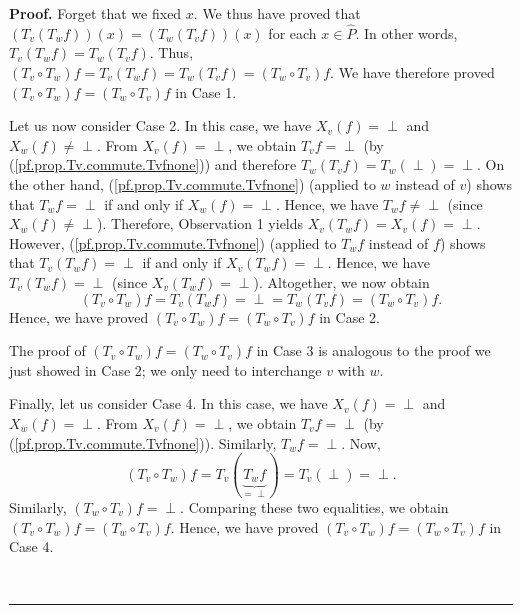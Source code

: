 \documentclass[numbers=enddot,12pt,final,onecolumn,notitlepage]{scrartcl}%
\theoremstyle{definition}
\newenvironment{verlong}{}{}
\newcommand{\undf}{\operatorname*{\bot}}
\newenvironment{proof}[1][Proof]{\noindent\textbf{#1.} }{\ \rule{0.5em}{0.5em}}
\begin{document}
\begin{verlong}
\begin{proof}
Forget that we fixed $x$. We thus have proved that $\left(  T_{v}\left(
T_{w}f\right)  \right)  \left(  x\right)  =\left(  T_{w}\left(  T_{v}f\right)
\right)  \left(  x\right)  $ for each $x\in\widehat{P}$. In other words,
$T_{v}\left(  T_{w}f\right)  =T_{w}\left(  T_{v}f\right)  $. Thus, $\left(
T_{v}\circ T_{w}\right)  f=T_{v}\left(  T_{w}f\right)  =T_{w}\left(
T_{v}f\right)  =\left(  T_{w}\circ T_{v}\right)  f$. We have therefore proved
$\left(  T_{v}\circ T_{w}\right)  f=\left(  T_{w}\circ T_{v}\right)  f$ in
Case 1.

Let us now consider Case 2. In this case, we have $X_{v}\left(  f\right)
=\undf$ and $X_{w}\left(  f\right)  \neq\undf$. From $X_{v}\left(  f\right)
=\undf$, we obtain $T_{v}f=\undf$ (by (\ref{pf.prop.Tv.commute.Tvfnone})) and
therefore $T_{w}\left(  T_{v}f\right)  =T_{w}\left(  \undf\right)  =\undf$. On
the other hand, (\ref{pf.prop.Tv.commute.Tvfnone}) (applied to $w$ instead of
$v$) shows that $T_{w}f=\undf$ if and only if $X_{w}\left(  f\right)  =\undf$.
Hence, we have $T_{w}f\neq\undf$ (since $X_{w}\left(  f\right)  \neq\undf$).
Therefore, Observation 1 yields $X_{v}\left(  T_{w}f\right)  =X_{v}\left(
f\right)  =\undf$. However, (\ref{pf.prop.Tv.commute.Tvfnone}) (applied to
$T_{w}f$ instead of $f$) shows that $T_{v}\left(  T_{w}f\right)  =\undf$ if
and only if $X_{v}\left(  T_{w}f\right)  =\undf$. Hence, we have $T_{v}\left(
T_{w}f\right)  =\undf$ (since $X_{v}\left(  T_{w}f\right)  =\undf$).
Altogether, we now obtain%
\[
\left(  T_{v}\circ T_{w}\right)  f=T_{v}\left(  T_{w}f\right)  =\undf=T_{w}%
\left(  T_{v}f\right)  =\left(  T_{w}\circ T_{v}\right)  f.
\]
Hence, we have proved $\left(  T_{v}\circ T_{w}\right)  f=\left(  T_{w}\circ
T_{v}\right)  f$ in Case 2.

The proof of $\left(  T_{v}\circ T_{w}\right)  f=\left(  T_{w}\circ
T_{v}\right)  f$ in Case 3 is analogous to the proof we just showed in Case 2;
we only need to interchange $v$ with $w$.

Finally, let us consider Case 4. In this case, we have $X_{v}\left(  f\right)
=\undf$ and $X_{w}\left(  f\right)  =\undf$. From $X_{v}\left(  f\right)
=\undf$, we obtain $T_{v}f=\undf$ (by (\ref{pf.prop.Tv.commute.Tvfnone})).
Similarly, $T_{w}f=\undf$. Now,%
\[
\left(  T_{v}\circ T_{w}\right)  f=T_{v}\left(  \underbrace{T_{w}f}%
_{=\undf}\right)  =T_{v}\left(  \undf\right)  =\undf.
\]
Similarly, $\left(  T_{w}\circ T_{v}\right)  f=\undf$. Comparing these two
equalities, we obtain $\left(  T_{v}\circ T_{w}\right)  f=\left(  T_{w}\circ
T_{v}\right)  f$. Hence, we have proved $\left(  T_{v}\circ T_{w}\right)
f=\left(  T_{w}\circ T_{v}\right)  f$ in Case 4.


\end{proof}
\end{verlong}
\end{document}
